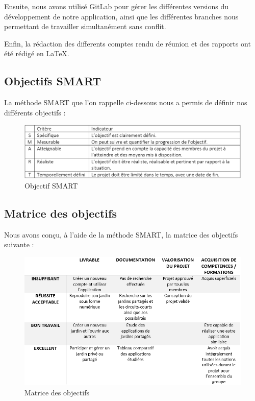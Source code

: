 \documentclass[french,a4paper]{article}
\begin{document}
Ensuite, nous avons utilisé GitLab pour gérer les différentes versions du développement de notre application, ainsi que les différentes branches nous permettant de travailler simultanément sans conflit.

Enfin, la rédaction des differents comptes rendu de réunion et des rapports ont été rédigé en \LaTeX.

\subsection{Objectifs SMART}
La méthode SMART que l'on rappelle ci-dessous nous a permis de définir nos différents objectifs :

\begin{figure}[H]
    \centering
    \includegraphics[width=1\textwidth]{img/SMART.png}
    \caption{Objectif SMART}
\end{figure}

\subsection{Matrice des objectifs}
Nous avons conçu, à l'aide de la méthode SMART, la matrice des objectifs suivante :

\begin{figure}[H]
    \centering
    \includegraphics[width=1\textwidth]{img/matrice_des_objectifs.png}
    \caption{Matrice des objectifs}
\end{figure}
\end{document}
